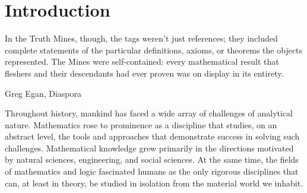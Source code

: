 
\chapter{Introduction}




\epigraph{In the Truth Mines, though, the tags weren't just references; they included complete statements of the particular definitions, axioms, or theorems the objects represented. The Mines were self-contained: every mathematical result that fleshers and their descendants had ever proven was on display in its entirety.}{Greg Egan, Diaspora}




Throughout history, mankind has faced a wide array of challenges of analytical nature.
Mathematics rose to prominence as a discipline that studies, on an abstract level, the tools and approaches that demonstrate success in solving such challenges.
Mathematical knowledge grew primarily in the directions motivated by
natural sciences, engineering, and social sciences.
At the same time, the fields of mathematics and logic
fascinated humans
as the only rigorous disciplines that can, at least in theory, be studied in isolation from the material world we inhabit.

